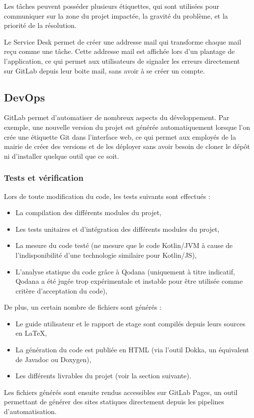 \documentclass[11pt,french]{memoir}
\begin{document}
	Les tâches peuvent posséder plusieurs étiquettes, qui sont utilisées pour communiquer sur la zone du projet impactée, la gravité du problème, et la priorité de la résolution.

	Le Service Desk permet de créer une addresse mail qui transforme chaque mail reçu comme une tâche.
	Cette addresse mail est affichée lors d'un plantage de l'application, ce qui permet aux utilisateurs de signaler les erreurs directement sur GitLab depuis leur boite mail, sans avoir à se créer un compte.

	\subsection{DevOps}\label{subsec:devops}

	GitLab permet d'automatiser de nombreux aspects du développement.
	Par exemple, une nouvelle version du projet est générée automatiquement lorsque l'on crée une étiquette Git dans l'interface web, ce qui permet aux employés de la mairie de créer des versions et de les déployer sans avoir besoin de cloner le dépôt ni d'installer quelque outil que ce soit.

	\subsubsection{Tests et vérification}

	Lors de toute modification du code, les tests suivants sont effectués :
	\begin{itemize}
		\item La compilation des différents modules du projet,
		\item Les tests unitaires et d'intégration des différents modules du projet,
		\item La mesure du code testé (ne mesure que le code Kotlin/JVM à cause de l'indisponibilité d'une technologie similaire pour Kotlin/JS),
		\item L'analyse statique du code grâce à Qodana (uniquement à titre indicatif, Qodana a été jugée trop expérimentale et instable pour être utilisée comme critère d'acceptation du code),
	\end{itemize}

	De plus, un certain nombre de fichiers sont générés :
	\begin{itemize}
		\item Le guide utilisateur et le rapport de stage sont compilés depuis leurs sources en \LaTeX,
		\item La génération du code est publiée en HTML (via l'outil Dokka, un équivalent de Javadoc ou Doxygen),
		\item Les différents livrables du projet (voir la section suivante).
	\end{itemize}
	Les fichiers générés sont ensuite rendus accessibles sur GitLab Pages, un outil permettant de générer des sites statiques directement depuis les pipelines d'automatisation.
\end{document}
